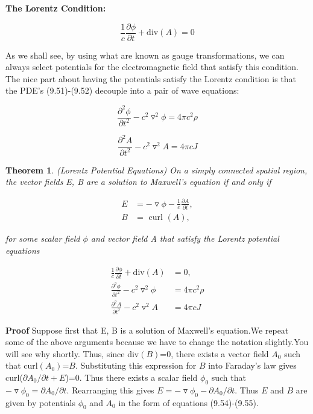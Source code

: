 \documentclass[12pt]{book}
\newtheorem{theorem}{Theorem}
\begin{document}
\noindent \textbf{The Lorentz Condition:}

\begin{equation}
\label{eq:1}
\frac{1}{c}\frac{{\partial}{\phi}}{\partial t}+\mbox{div}(A)=0
\end{equation}

\noindent As we shall see, by using what are known as gauge transformations, we can always select potentials for the electromagnetic field that satisfy this condition. The nice part about having the potentials satisfy the Lorentz condition is that the PDE's (9.51)-(9.52) decouple into a pair of wave equations:

$$\frac{{\partial^2}{\phi}}{\partial t^2}-c^2\triangledown^2\phi=4\pi c^2\rho$$

$$\frac{\partial^2 A}{\partial t^2}-c^2\triangledown^2A=4\pi cJ$$

\begin{theorem} \emph (Lorentz Potential Equations)
On a simply connected spatial region, the vector fields E, B are a solution to Maxwell's equation if and only if

\begin{align}
E&=-\triangledown\phi-\frac{1}{c}\frac{\partial A}{\partial t},\\
B&= \mbox{ curl }(A),
\end{align}

\noindent for some scalar field $\phi$ and vector field A that satisfy the Lorentz potential equations

\begin{align}
\frac{1}{c}\frac{\partial \phi}{\partial t}+\mbox{div}(A)&=0,\\
\frac{\partial^2 \phi}{\partial t^2}-c^2\triangledown^2\phi&=4\pi c^2\rho\\
\frac{\partial^2 A}{\partial t^2}-c^2\triangledown^2A&=4\pi cJ
\end{align}

\end{theorem}

\noindent \textbf {Proof}
Suppose first that E, B is a solution of Maxwell's equation.We repeat some of the above arguments because we have to change the notation slightly.You will see why shortly. Thus, since div$(B)$=0, there exists a vector field $A_0$ such that curl$(A_0)$=$B$. Substituting this expression for $B$ into Faraday's law gives curl($\partial A_0/\partial t+E$)=0. Thus there exists a scalar field $\phi_0$ such that $-\triangledown\phi_0=\partial A_0/\partial t$. Rearranging this gives $E=-\triangledown\phi_0-\partial A_0/\partial t$. Thus $E$ and $B$ are given by potentials $\phi_0$ and $A_0$ in the form of equations (9.54)-(9.55).
\end{document}
